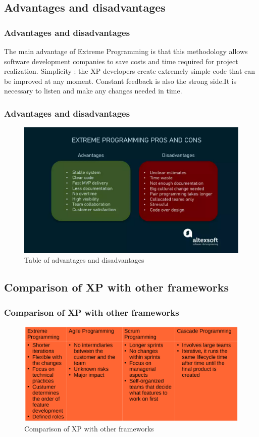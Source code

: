 \documentclass[
	11pt, 
]{beamer}
\begin{document}
\subsection{Advantages and disadvantages}
\begin{frame}
	\frametitle{Advantages and disadvantages}
The main advantage of Extreme Programming is that this methodology allows
software development companies to save costs and time required for project
realization.
Simplicity : the XP developers create extremely simple code that can be
improved at any moment.
Constant feedback is also the strong side.It is necessary to listen and make
any changes needed in time.\cite{p1,p4}
	\bigskip %
\end{frame}
\begin{frame}
	\frametitle{Advantages and disadvantages}
	\begin{figure}
		\includegraphics[width=0.8\linewidth]{ext5.pdf}
		\caption{Table of advantages and disadvantages \cite{p4}}
	\end{figure}
\end{frame}
\subsection{Comparison of XP with other frameworks}
\begin{frame}
	\frametitle{Comparison of XP with other frameworks}
	\begin{figure}
		\includegraphics[width=0.8\linewidth]{ext6.pdf}
		\caption{Comparison of XP with other frameworks \cite{p2}}
	\end{figure}
	\bigskip %
\end{frame}
\end{document}
